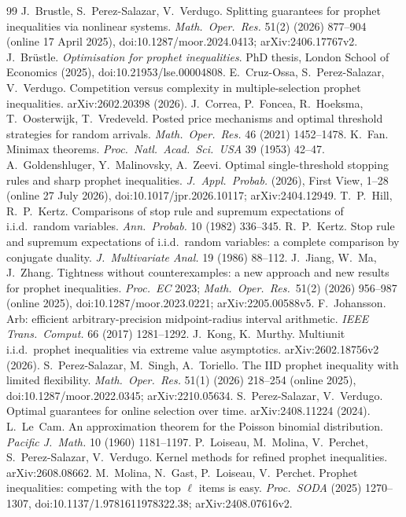 \documentclass[11pt]{article}
\theoremstyle{remark}
\begin{document}
\begin{thebibliography}{99}
 J.~Brustle, S.~Perez-Salazar, V.~Verdugo. Splitting guarantees for prophet inequalities via nonlinear systems. \emph{Math.\ Oper.\ Res.} 51(2) (2026) 877--904 (online 17 April 2025), doi:10.1287/moor.2024.0413; arXiv:2406.17767v2.
 J.~Br\"ustle. \emph{Optimisation for prophet inequalities}. PhD thesis, London School of Economics (2025), doi:10.21953/lse.00004808.
 E.~Cruz-Ossa, S.~Perez-Salazar, V.~Verdugo. Competition versus complexity in multiple-selection prophet inequalities. arXiv:2602.20398 (2026).
 J.~Correa, P.~Foncea, R.~Hoeksma, T.~Oosterwijk, T.~Vredeveld. Posted price mechanisms and optimal threshold strategies for random arrivals. \emph{Math.\ Oper.\ Res.} 46 (2021) 1452--1478.
 K.~Fan. Minimax theorems. \emph{Proc.\ Natl.\ Acad.\ Sci.\ USA} 39 (1953) 42--47.
 A.~Goldenshluger, Y.~Malinovsky, A.~Zeevi. Optimal single-threshold stopping rules and sharp prophet inequalities. \emph{J.\ Appl.\ Probab.} (2026), First View, 1--28 (online 27 July 2026), doi:10.1017/jpr.2026.10117; arXiv:2404.12949.
 T.~P.~Hill, R.~P.~Kertz. Comparisons of stop rule and supremum expectations of i.i.d.\ random variables. \emph{Ann.\ Probab.} 10 (1982) 336--345.
 R.~P.~Kertz. Stop rule and supremum expectations of i.i.d.\ random variables: a complete comparison by conjugate duality. \emph{J.\ Multivariate Anal.} 19 (1986) 88--112.
 J.~Jiang, W.~Ma, J.~Zhang. Tightness without counterexamples: a new approach and new results for prophet inequalities. \emph{Proc.\ EC} 2023; \emph{Math.\ Oper.\ Res.}\ 51(2) (2026) 956--987 (online 2025), doi:10.1287/moor.2023.0221; arXiv:2205.00588v5.
 F.~Johansson. Arb: efficient arbitrary-precision midpoint-radius interval arithmetic. \emph{IEEE Trans.\ Comput.} 66 (2017) 1281--1292.
 J.~Kong, K.~Murthy. Multiunit i.i.d.\ prophet inequalities via extreme value asymptotics. arXiv:2602.18756v2 (2026).
 S.~Perez-Salazar, M.~Singh, A.~Toriello. The IID prophet inequality with limited flexibility. \emph{Math.\ Oper.\ Res.} 51(1) (2026) 218--254 (online 2025), doi:10.1287/moor.2022.0345; arXiv:2210.05634.
 S.~Perez-Salazar, V.~Verdugo. Optimal guarantees for online selection over time. arXiv:2408.11224 (2024).
 L.~Le~Cam. An approximation theorem for the Poisson binomial distribution. \emph{Pacific J.\ Math.} 10 (1960) 1181--1197.
 P.~Loiseau, M.~Molina, V.~Perchet, S.~Perez-Salazar, V.~Verdugo. Kernel methods for refined prophet inequalities. arXiv:2608.08662.
 M.~Molina, N.~Gast, P.~Loiseau, V.~Perchet. Prophet inequalities: competing with the top $\ell$ items is easy. \emph{Proc.\ SODA} (2025) 1270--1307, doi:10.1137/1.9781611978322.38; arXiv:2408.07616v2.
\end{thebibliography}
\end{document}
